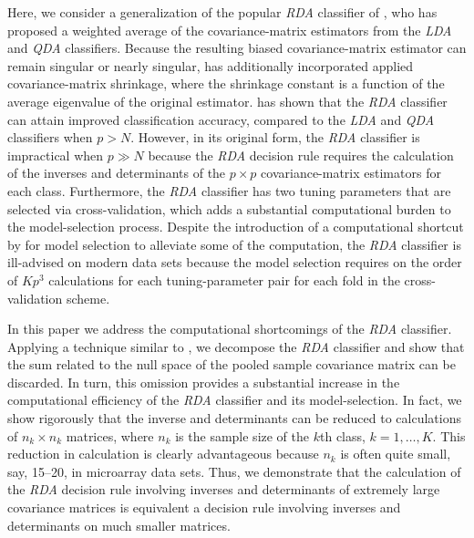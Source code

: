\documentclass[11pt]{article}
\begin{document}
Here, we consider a generalization of the popular \emph{RDA} classifier of \cite{Friedman:1989tm}, who has proposed a weighted average of the covariance-matrix estimators from the \emph{LDA} and \emph{QDA} classifiers. Because the resulting biased covariance-matrix estimator can remain singular or nearly singular, \cite{Friedman:1989tm} has additionally incorporated applied covariance-matrix shrinkage, where the shrinkage constant is a function of the average eigenvalue of the original estimator. \cite{Friedman:1989tm} has shown that the \emph{RDA} classifier can attain improved classification accuracy, compared to the \emph{LDA} and \emph{QDA} classifiers when $p > N$. However, in its original form, the \emph{RDA} classifier is impractical when $p \gg N$ because the \emph{RDA} decision rule requires the calculation of the inverses and determinants of the $p \times p$ covariance-matrix estimators for each class. Furthermore, the \emph{RDA} classifier has two tuning parameters that are selected via cross-validation, which adds a substantial computational burden to the model-selection process. Despite the introduction of a computational shortcut by \cite{Friedman:1989tm} for model selection to alleviate some of the computation, the \emph{RDA} classifier is ill-advised on modern data sets because the model selection requires on the order of $Kp^3$ calculations for each tuning-parameter pair for each fold in the cross-validation scheme.

In this paper we address the computational shortcomings of the \emph{RDA} classifier. Applying a technique similar to \cite{Ye:2006tq}, we decompose the \emph{RDA} classifier and show that the sum related to the null space of the pooled sample covariance matrix can be discarded. In turn, this omission provides a substantial increase in the computational efficiency of the \emph{RDA} classifier and its model-selection. In fact, we show rigorously that the inverse and determinants can be reduced to calculations of $n_k \times n_k$ matrices, where $n_k$ is the sample size of the $k$th class, $k = 1, \ldots, K$. This reduction in calculation is clearly advantageous because $n_k$ is often quite small, say, 15--20, in microarray data sets. Thus, we demonstrate that the calculation of the \emph{RDA} decision rule involving inverses and determinants of extremely large covariance matrices is equivalent a decision rule involving inverses and determinants on much smaller matrices.
\end{document}
